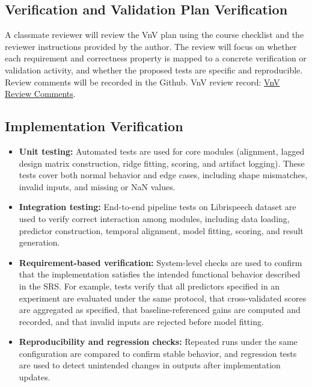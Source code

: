 \documentclass[12pt, titlepage]{article}
\begin{document}
\subsection{Verification and Validation Plan Verification}



A classmate reviewer will review the VnV plan using the course checklist and the reviewer instructions provided by the author. The review will focus on whether each requirement and correctness property is mapped to a concrete verification or validation activity, and whether the proposed tests are specific and reproducible. Review comments will be recorded in the Github.  
VnV review record: \href{https://github.com/Krozix-2026/cas741-speech-trf/issues}{VnV Review Comments}.




\subsection{Implementation Verification}


\begin{itemize}
  \item \textbf{Unit testing:} Automated tests are used for core modules
  (alignment, lagged design matrix construction, ridge fitting, scoring, and
  artifact logging). These tests cover both normal behavior and edge cases,
  including shape mismatches, invalid inputs, and missing or NaN values.

  \item \textbf{Integration testing:} End-to-end pipeline tests on Librispeech dataset are used to verify correct interaction among modules,
  including data loading, predictor construction, temporal alignment, model
  fitting, scoring, and result generation.

  \item \textbf{Requirement-based verification:} System-level checks are used to
  confirm that the implementation satisfies the intended functional behavior
  described in the SRS. For example, tests verify that all predictors specified
  in an experiment are evaluated under the same protocol, that cross-validated
  scores are aggregated as specified, that baseline-referenced gains are
  computed and recorded, and that invalid inputs are rejected before model
  fitting.

  \item \textbf{Reproducibility and regression checks:} Repeated runs under the
  same configuration are compared to confirm stable behavior, and regression
  tests are used to detect unintended changes in outputs after implementation
  updates.
\end{itemize}
\end{document}
